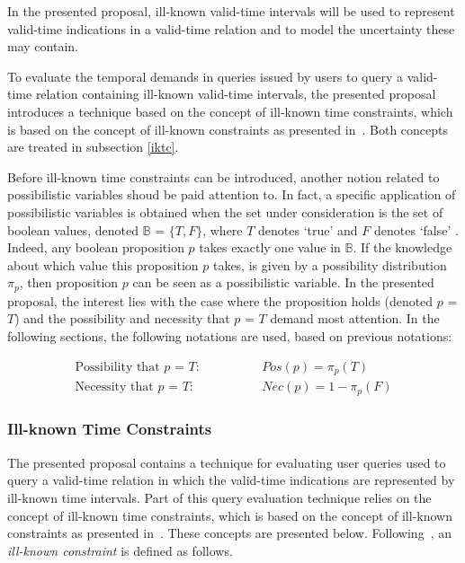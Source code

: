 
In the presented proposal, ill-known valid-time intervals will be used to represent valid-time indications in a valid-time relation and to model the uncertainty these may contain.

To evaluate the temporal demands in queries issued by users to query a valid-time relation containing ill-known valid-time intervals, the presented proposal introduces a technique based on the concept of ill-known time constraints, which is based on the concept of ill-known constraints as presented in~\cite{Pon11}. Both concepts are treated in subsection \ref{iktc}.

Before ill-known time constraints can be introduced, another notion related to possibilistic variables shoud be paid attention to. In fact, a specific application of possibilistic variables is obtained when the set under consideration is the set of boolean values, denoted $\mathbb{B}$ = $\{T,F\}$, where $T$ denotes `true' and $F$ denotes `false' \cite{Pon11}. Indeed, any boolean proposition $p$ takes exactly one value in $\mathbb{B}$. If the knowledge about which value this proposition $p$ takes, is given by a possibility distribution $\pi_p$, then proposition $p$ can be seen as a possibilistic variable. In the presented proposal, the interest lies with the case where the proposition holds (denoted $p$ = $T$) and the possibility and necessity that $p$ = $T$ demand most attention. In the following sections, the following notations are used, based on previous notations:

\begin{align}
\text{Possibility that $p$ = $T$:} \hspace{50pt} & Pos(p) = \pi_p(T) \\
\text{Necessity that $p$ = $T$:} \hspace{50pt} & Nec(p) = 1-\pi_p(F) 
\end{align}


\subsubsection{\label{iktc}Ill-known Time Constraints}
The presented proposal contains a technique for evaluating user queries used to query a valid-time relation in which the valid-time indications are represented by ill-known time intervals. Part of this query evaluation technique relies on the concept of ill-known time constraints, which is based on the concept of ill-known constraints as presented in~\cite{Pon11}. These concepts are presented below. Following~\cite{Pon11}, an \emph{ill-known constraint} is defined as follows.

